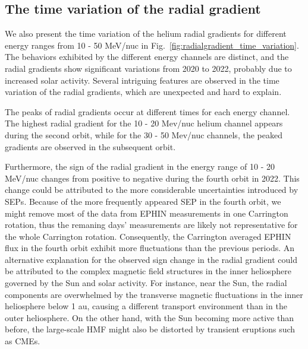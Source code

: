 \subsection*{The time variation of the radial gradient}

We also present the time variation of the helium radial gradients for different energy ranges from 10 - 50 MeV/nuc in Fig.~\ref{fig:radialgradient_time_variation}. The behaviors exhibited by the different energy channels are distinct, and the radial gradients show significant variations from 2020 to 2022, probably due to increased solar activity. Several intriguing features are observed in the time variation of the radial gradients, which are unexpected and hard to explain.

The peaks of radial gradients occur at different times for each energy channel. The highest radial gradient for the 10 - 20 Mev/nuc helium channel appears during the second orbit, while for the 30 - 50 Mev/nuc channels, the peaked gradients are observed in the subsequent orbit.

Furthermore, the sign of the radial gradient in the energy range of 10 - 20 MeV/nuc changes from positive to negative during the fourth orbit in 2022. This change could be attributed to the more considerable uncertainties introduced by \acp{SEP}. Because of the more frequently appeared \ac{SEP} in the fourth orbit, we might remove most of the data from \ac{EPHIN} measurements in one Carrington rotation, thus the remaning days' measurements are likely not representative for the whole Carrington rotation. Consequently, the Carrington averaged \ac{EPHIN} flux in the fourth orbit exhibit more fluctuations than the previous periods. 
An alternative explanation for the observed sign change in the radial gradient could be attributed to the complex magnetic field structures in the inner heliosphere governed by the Sun and solar activity. 
For instance, near the Sun, the radial components are overwhelmed by the transverse magnetic fluctuations \citep{Rankin2022ApJ} in the inner heliosphere below 1 au, causing a different transport environment than in the outer heliosphere.
On the other hand, with the Sun becoming more active than before, the large-scale \acs{HMF} might also be distorted by transient eruptions such as \acp{CME}.


